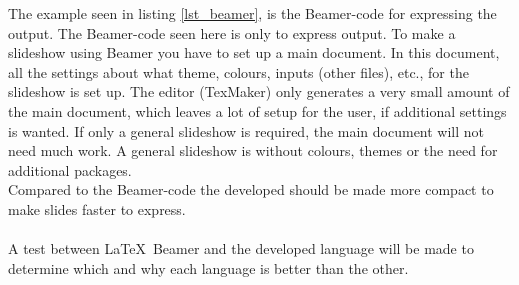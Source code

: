 The example seen in listing \ref{lst_beamer}, is the Beamer-code for expressing the output. The Beamer-code seen here is only to express output. To make a slideshow using Beamer you have to set up a main document. In this document, all the settings about what theme, colours, inputs (other files), etc., for the slideshow is set up. The editor (TexMaker) only generates a very small amount of the main document, which leaves a lot of setup for the user, if additional settings is wanted. If only a general slideshow is required, the main document will not need much work. A general slideshow is without colours, themes or the need for additional packages.\\

Compared to the Beamer-code the developed should be made more compact to make slides faster to express.
\\ \\
A test between \LaTeX~Beamer and the developed language will be made to determine which and why each language is better than the other.